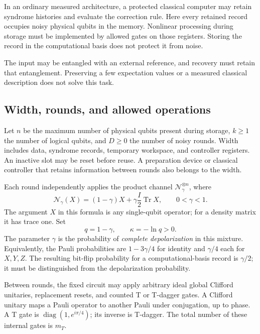 \documentclass[11pt,a4paper]{article}
\numberwithin{equation}{section}
\theoremstyle{remark}\newtheorem*{remark}{Interpretation}
\newcommand{\Tr}{\operatorname{Tr}}
\newcommand{\N}{\mathcal N}
\begin{document}
In an ordinary measured architecture, a protected classical computer may retain syndrome histories and evaluate the correction rule. Here every retained record occupies noisy physical qubits in the memory. Nonlinear processing during storage must be implemented by allowed gates on those registers. Storing the record in the computational basis does not protect it from noise.

The input may be entangled with an external reference, and recovery must retain that entanglement. Preserving a few expectation values or a measured classical description does not solve this task.

\subsection{Width, rounds, and allowed operations}
Let $n$ be the maximum number of physical qubits present during storage, $k\ge1$ the number of logical qubits, and $D\ge0$ the number of noisy rounds. Width includes data, syndrome records, temporary workspace, and controller registers. An inactive slot may be reset before reuse. A preparation device or classical controller that retains information between rounds also belongs to the width.

Each round independently applies the product channel $\N_\gamma^{\otimes n}$, where
\begin{equation}
\N_\gamma(X)=(1-\gamma)X+\gamma\frac I2\Tr X,
\qquad 0<\gamma<1.
\label{eq:noise}
\end{equation}
The argument $X$ in this formula is any single-qubit operator; for a density matrix it has trace one. Set
\begin{equation}
q=1-\gamma,\qquad \kappa=-\ln q>0.
\end{equation}
The parameter $\gamma$ is the probability of \emph{complete depolarization} in this mixture. Equivalently, the Pauli probabilities are $1-3\gamma/4$ for identity and $\gamma/4$ each for $X,Y,Z$. The resulting bit-flip probability for a computational-basis record is $\gamma/2$; it must be distinguished from the depolarization probability.

Between rounds, the fixed circuit may apply arbitrary ideal global Clifford unitaries, replacement resets, and counted T or T-dagger gates. A Clifford unitary maps a Pauli operator to another Pauli under conjugation, up to phase. A T gate is $\operatorname{diag}(1,e^{i\pi/4})$; its inverse is T-dagger. The total number of these internal gates is $m_T$.
\end{document}
